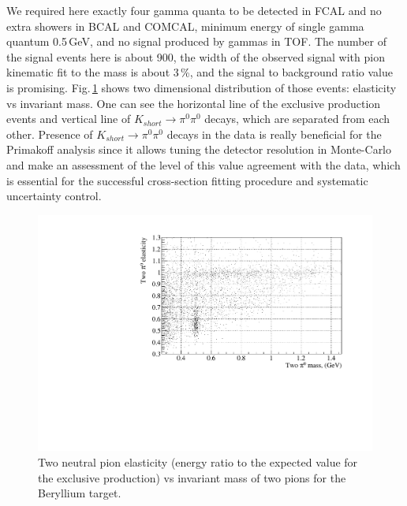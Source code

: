 We required here exactly four gamma quanta to be detected in FCAL and no extra showers in BCAL and COMCAL, minimum energy of single gamma quantum 0.5$\,$GeV, and no signal produced by gammas in TOF. The number of the signal events here is about 900, the width of the observed signal with pion kinematic fit to the mass is about 3$\,$\%, and the signal to background ratio value is promising. Fig.$\,$\ref{fig:2dbe} shows two dimensional distribution of those events: elasticity vs invariant mass. One can see the horizontal line of the exclusive production events and vertical line of $K_{short}\to\pi^0\pi^0$ decays, which are separated from each other. Presence of $K_{short}\to\pi^0\pi^0$ decays in the data is really beneficial for the Primakoff analysis since it allows tuning the detector resolution in Monte-Carlo and make an assessment of the level of this value agreement with the data, which is essential for the successful cross-section fitting procedure and systematic uncertainty control.
\begin{figure}[!h]
\centering\includegraphics[width=4.75in]{figures/2d_be.pdf}
\caption{Two neutral pion elasticity (energy ratio to the expected value for the exclusive production) vs invariant mass of two pions for the Beryllium target.
\label{fig:2dbe}}
\end{figure}

